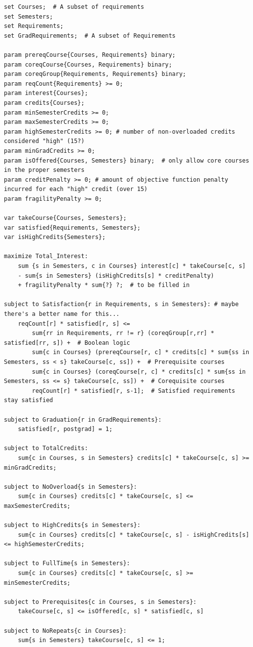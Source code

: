 \documentclass[12pt]{article}
\begin{document}
\begin{verbatim}
set Courses;  # A subset of requirements
set Semesters;
set Requirements;
set GradRequirements;  # A subset of Requirements

param prereqCourse{Courses, Requirements} binary;
param coreqCourse{Courses, Requirements} binary;
param coreqGroup{Requirements, Requirements} binary;
param reqCount{Requirements} >= 0;
param interest{Courses};
param credits{Courses};
param minSemesterCredits >= 0;
param maxSemesterCredits >= 0;
param highSemesterCredits >= 0; # number of non-overloaded credits considered "high" (15?)
param minGradCredits >= 0;
param isOffered{Courses, Semesters} binary;  # only allow core courses in the proper semesters
param creditPenalty >= 0; # amount of objective function penalty incurred for each "high" credit (over 15)
param fragilityPenalty >= 0;

var takeCourse{Courses, Semesters};
var satisfied{Requirements, Semesters};
var isHighCredits{Semesters};

maximize Total_Interest:
    sum {s in Semesters, c in Courses} interest[c] * takeCourse[c, s]
    - sum{s in Semesters} (isHighCredits[s] * creditPenalty)
    + fragilityPenalty * sum{?} ?;  # to be filled in

subject to Satisfaction{r in Requirements, s in Semesters}: # maybe there's a better name for this...
    reqCount[r] * satisfied[r, s] <=
        sum{rr in Requirements, rr != r} (coreqGroup[r,rr] * satisfied[rr, s]) +  # Boolean logic
        sum{c in Courses} (prereqCourse[r, c] * credits[c] * sum{ss in Semesters, ss < s} takeCourse[c, ss]) +  # Prerequisite courses
        sum{c in Courses} (coreqCourse[r, c] * credits[c] * sum{ss in Semesters, ss <= s} takeCourse[c, ss]) +  # Corequisite courses
        reqCount[r] * satisfied[r, s-1];  # Satisfied requirements stay satisfied

subject to Graduation{r in GradRequirements}:
    satisfied[r, postgrad] = 1;

subject to TotalCredits:
    sum{c in Courses, s in Semesters} credits[c] * takeCourse[c, s] >= minGradCredits;

subject to NoOverload{s in Semesters}:
    sum{c in Courses} credits[c] * takeCourse[c, s] <= maxSemesterCredits;

subject to HighCredits{s in Semesters}:
    sum{c in Courses} credits[c] * takeCourse[c, s] - isHighCredits[s] <= highSemesterCredits;

subject to FullTime{s in Semesters}:
    sum{c in Courses} credits[c] * takeCourse[c, s] >= minSemesterCredits;

subject to Prerequisites{c in Courses, s in Semesters}:
    takeCourse[c, s] <= isOffered[c, s] * satisfied[c, s]

subject to NoRepeats{c in Courses}:
    sum{s in Semesters} takeCourse[c, s] <= 1;

\end{verbatim}
\end{document}
